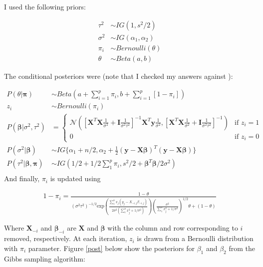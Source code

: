 \documentclass[12pt]{article}
\begin{document}
I used the following priors:

\begin{align*}
    \tau^2 &\sim IG(1, s^2/2)\\
    \sigma^2 &\sim IG(\alpha_1, \alpha_2)\\
    \pi_i &\sim Bernoulli(\theta)\\
    \theta & \sim Beta(a, b)
\end{align*}

The conditional posteriors were (note that I checked my answers against \cite{andrade2020disjunct}):

\begin{align}
    P(\theta|\boldsymbol{\pi}) &\sim Beta(a + \sum_{i=1}^p \pi_i, b + \sum_{i=1}^p [1-\pi_i])\\
    z_i &\sim Bernoulli(\pi_i)\\
    P(\boldsymbol{\beta}|\sigma^2, \tau^2) &= \begin{cases}
     \mathcal{N}\left(\left[\boldsymbol{X}^T\boldsymbol{X} \frac{1}{\sigma^2} + \boldsymbol{I}\frac{1}{\sigma^2\tau^2}\right]^{-1}\boldsymbol{X}^T \boldsymbol{y} \frac{1}{\sigma^2}, \left[\boldsymbol{X}^T\boldsymbol{X} \frac{1}{\sigma^2} + \boldsymbol{I}\frac{1}{\sigma^2\tau^2}\right]^{-1}\right)& \text{if } z_i = 1\\
    0             & \text{if } z_i = 0
\end{cases}\\
P(\sigma^2|\boldsymbol{\beta}) &\sim IG\{\alpha_1 + n/2, \alpha_2 + \frac{1}{2}(\boldsymbol{y}-\boldsymbol{X}\boldsymbol{\beta})^T(\boldsymbol{y}-\boldsymbol{X}\boldsymbol{\beta})\} \\
P(\tau^2|\boldsymbol{\beta}, \boldsymbol{\pi}) &\sim IG(1/2 + 1/2\sum_1^{p}\pi_i, s^2/2 + \boldsymbol{\beta}^T\boldsymbol{\beta}/2\sigma^2)\\
\end{align}
And finally, $\pi_i$ is updated using 

\begin{align}
    1-\pi_i = \frac{1-\theta}{(\sigma^2\tau^2)^{-1/2}\text{exp}\left(\frac{\sum_1^n x_j(y_j - X_{-i, j}\beta_{-i, j})}{2\sigma^2(\sum_1^n x_j^2 + 1/\sigma^2)}\right)  \left(\frac{\sigma^2}{\sum_1^n x_j^2 + 1/\sigma^2}\right)^{1/2}\theta   + (1-\theta)  }
\end{align}

Where $\boldsymbol{X}_{-i}$ and $\boldsymbol{\beta}_{-i}$ are $\boldsymbol{X}$ and $\boldsymbol{\beta}$ with the column and row corresponding to $i$ removed, respectively. At each iteration, $z_i$ is drawn from a Bernoulli distribution with $\pi_i$ parameter. Figure \ref{post} below show the posteriors for $\beta_1$ and $\beta_2$ from the Gibbs sampling algorithm:
\end{document}
